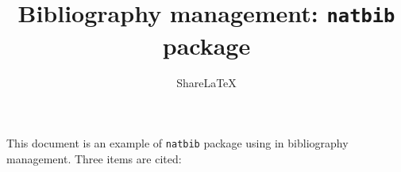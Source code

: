 \documentclass{article}
\title{Bibliography management: \texttt{natbib} package}
\author{Share\LaTeX}
\date { }
\begin{document}
	
	\maketitle
	
	This document is an example of \texttt{natbib} package using in bibliography 
	management. Three items are cited: \cite{D.Pohl.1992}
	
	\medskip
	
	
	
\end{document}
